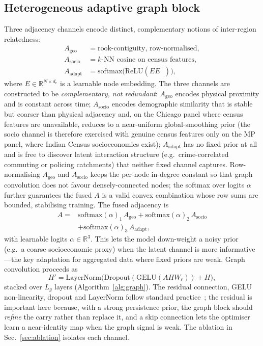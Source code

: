\documentclass[11pt,conference]{IEEEtran}
\newcommand{\Ageo}{A_{\mathrm{geo}}}
\newcommand{\Asocio}{A_{\mathrm{socio}}}
\newcommand{\Aadapt}{A_{\mathrm{adapt}}}
\newcommand{\R}{\mathbb{R}}
\begin{document}
\subsection{Heterogeneous adaptive graph block}\label{sec:graph}
Three adjacency channels encode distinct, complementary notions of
inter-region relatedness:
\begin{align}
  \Ageo &= \text{rook-contiguity, row-normalised},\\
  \Asocio &= \text{$k$-NN cosine on census features},\\
  \Aadapt &= \mathrm{softmax}\!\big(\mathrm{ReLU}(E E^{\top})\big),
\end{align}
where $E\in\R^{N\times d_e}$ is a learnable node embedding. The three channels
are constructed to be \emph{complementary, not redundant}: $\Ageo$ encodes
physical proximity and is constant across time; $\Asocio$ encodes demographic
similarity that is stable but coarser than physical adjacency and, on the
Chicago panel where census features are unavailable, reduces to a near-uniform
global-smoothing prior (the socio channel is therefore exercised with genuine
census features only on the MP panel, where Indian Census socioeconomics
exist); $\Aadapt$ has no fixed prior at all and is
free to discover latent interaction structure (e.g.\ crime-correlated commuting
or policing catchments) that neither fixed channel captures. Row-normalising
$\Ageo$ and $\Asocio$ keeps the per-node in-degree constant so that graph
convolution does not favour densely-connected nodes; the softmax over logits
$\alpha$ further guarantees the fused $A$ is a valid convex combination whose
row sums are bounded, stabilising training. The fused adjacency is
\begin{equation}\label{eq:fusion}
\begin{split}
  A ={}& \mathrm{softmax}(\alpha)_1\,\Ageo
       + \mathrm{softmax}(\alpha)_2\,\Asocio\\
     & + \mathrm{softmax}(\alpha)_3\,\Aadapt,
\end{split}
\end{equation}
with learnable logits $\alpha\in\R^3$. This lets the model down-weight a noisy
prior (e.g.\ a coarse socioeconomic proxy) when the latent channel is more
informative---the key adaptation for aggregated data where fixed priors are
weak. Graph convolution proceeds as
\begin{equation}\label{eq:gcn}
  H' = \mathrm{LayerNorm}\!\big(\mathrm{Dropout}(\mathrm{GELU}(A H W_\ell)) + H\big),
\end{equation}
stacked over $L_g$ layers (Algorithm~\ref{alg:graph}). The residual
connection, GELU non-linearity, dropout and LayerNorm follow standard
practice~\cite{kipf2017gcn}; the residual is important here because, with a
strong persistence prior, the graph block should \emph{refine} the carry rather
than replace it, and a skip connection lets the optimiser learn a near-identity
map when the graph signal is weak. The ablation in
Sec.~\ref{sec:ablation} isolates each channel.
\end{document}

